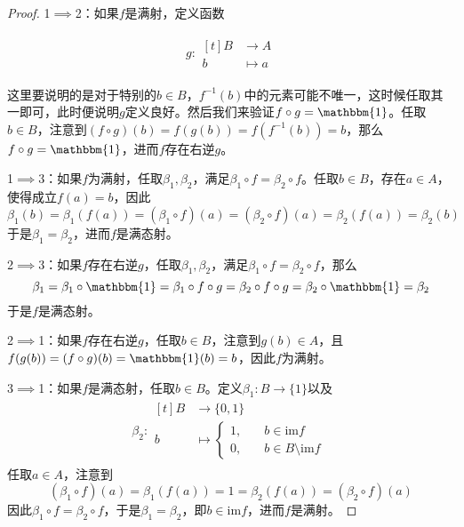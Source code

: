 \documentclass[lang = cn, scheme = chinese, thmcnt = section]{elegantbook}
\newcommand{\function}[5]{
	\begin{align*}
		#1:\begin{aligned}[t]
			#2 &\longrightarrow #3\\
			#4 &\longmapsto #5
		\end{aligned}
	\end{align*}
}                                     %
\begin{document}
\begin{proof}
	1$\implies$2：如果$f$是满射，定义函数
	\function{g}{B}{A}{b}{a}
	这里要说明的是对于特别的$b\in B$，$f^{-1}(b)$中的元素可能不唯一，这时候任取其一即可，此时便说明$g$定义良好。然后我们来验证$f\circ g=\mathbbm{1}$。任取$b\in B$，注意到$(f\circ g)(b)=f(g(b))=f(f^{-1}(b))=b$，那么$f\circ g=\mathbbm{1}$，进而$f$存在右逆$g$。
	
	1$\implies$3：如果$f$为满射，任取$\beta_1,\beta_2$，满足$\beta_1\circ f=\beta_2\circ f$。任取$b\in B$，存在$a\in A$，使得成立$f(a)=b$，因此
	$$
	\beta_1(b)=\beta_1(f(a))=(\beta_1\circ f)(a)=(\beta_2\circ f)(a)=\beta_2(f(a))=\beta_2(b)
	$$
	于是$\beta_1=\beta_2$，进而$f$是满态射。
	
	2$\implies $3：如果$f$存在右逆$g$，任取$\beta_1,\beta_2$，满足$\beta_1\circ f=\beta_2\circ f$，那么
	$$
	\beta_1=\beta_1\circ \mathbbm{1}=\beta_1\circ f\circ g=\beta_2\circ f\circ g=\beta_2\circ \mathbbm{1}=\beta_2
	$$
	于是$f$是满态射。
	
	2$\implies$1：如果$f$存在右逆$g$，任取$b\in B$，注意到$g(b)\in A$，且$f(g(b))=(f\circ g)(b)=\mathbbm{1}(b)=b$，因此$f$为满射。
	
	3$\implies$1：如果$f$是满态射，任取$b\in B$。定义$\beta_1:B\to\{1\}$以及
	\begin{align*}
		\beta_2: \begin{aligned}[t]
			B &\longrightarrow \{0,1\}\\
			b &\longmapsto \begin{cases}
				1,\quad & b\in\mathrm{im}f\\
				0,\quad & b\in B\setminus\mathrm{im}f
			\end{cases}
		\end{aligned}
	\end{align*}
	任取$a\in A$，注意到
	$$
	(\beta_1\circ f)(a)=\beta_1(f(a))=1=\beta_2(f(a))=(\beta_2\circ f)(a)
	$$
	因此$\beta_1\circ f=\beta_2\circ f$，于是$\beta_1=\beta_2$，即$b\in\mathrm{im}f$，进而$f$是满射。
\end{proof}








	
\end{document}
